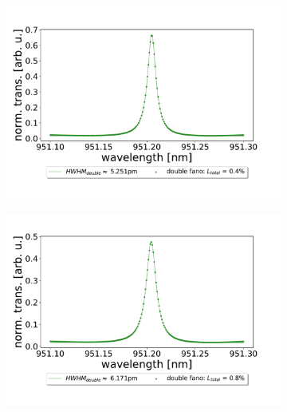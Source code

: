 \begin{figure}[h!]
\begin{subfigure}[b]{0.49\textwidth}
        \label{fig:0.2_percent_loss}
    \end{subfigure}
    \begin{subfigure}[b]{0.49\textwidth}
        \includegraphics[width=\textwidth]{figures/double_04_percent_loss_30um.pdf}
        \caption{}
        \label{fig:0.4_percent_loss}
    \end{subfigure}
    \begin{subfigure}[b]{0.49\textwidth}
        \includegraphics[width=\textwidth]{figures/double_08_percent_loss_30um.pdf}
        \caption{}
        \label{fig:0.8_percent_loss}
    \end{subfigure}
    \begin{subfigure}[b]{0.49\textwidth}

\end{subfigure}
\end{figure}
